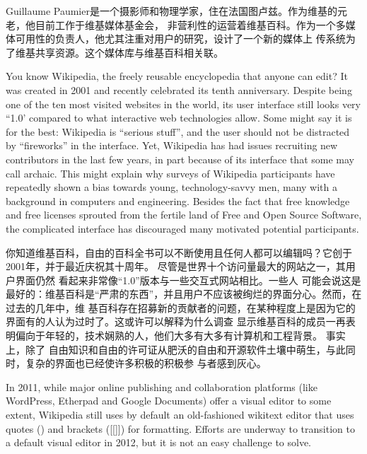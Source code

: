 

Guillaume Paumier是一个摄影师和物理学家，住在法国图卢兹。作为维基的元老，他目前工作于维基媒体基金会，
非营利性的运营着维基百科。作为一个多媒体可用性的负责人，他尤其注重对用户的研究，设计了一个新的媒体上
传系统为了维基共享资源。这个媒体库与维基百科相关联。

\noindent{}You know Wikipedia, the freely reusable encyclopedia that anyone can edit? It
was created in 2001 and recently celebrated its tenth anniversary. Despite being
one of the ten most visited websites in the world, its user interface still
looks very ``1.0' compared to what interactive web technologies allow. Some
might say it is for the best: Wikipedia is ``serious stuff'', and the user
should not be distracted by ``fireworks'' in the interface. Yet, Wikipedia has had
issues recruiting new contributors in the last few years, in part because of its
interface that some may call archaic. This might explain why surveys of
Wikipedia participants have repeatedly shown a bias towards young,
technology-savvy men, many with a background in computers and engineering.
Besides the fact that free knowledge and free licenses sprouted from the fertile
land of Free and Open Source Software, the complicated interface has discouraged
many motivated potential participants.

你知道维基百科，自由的百科全书可以不断使用且任何人都可以编辑吗？它创于2001年，并于最近庆祝其十周年。
尽管是世界十个访问量最大的网站之一，其用户界面仍然 看起来非常像“1.0”版本与一些交互式网站相比。一些人
可能会说这是最好的：维基百科是“严肃的东西”，并且用户不应该被绚烂的界面分心。然而，在过去的几年中，维
基百科存在招募新的贡献者的问题，在某种程度上是因为它的界面有的人认为过时了。这或许可以解释为什么调查 
显示维基百科的成员一再表明偏向于年轻的，技术娴熟的人，他们大多有大多有计算机和工程背景。 事实上，除了
自由知识和自由的许可证从肥沃的自由和开源软件土壤中萌生，与此同时，复杂的界面也已经使许多积极的积极参
与者感到灰心。

In 2011, while major online publishing and collaboration platforms (like
WordPress, Etherpad and Google Documents) offer a visual editor to some extent,
Wikipedia still uses by default an old-fashioned wikitext editor that uses
quotes (\textquotesingle \textquotesingle \textquotesingle \textquotesingle) and
brackets ([[]]) for formatting. Efforts are underway to transition to a default
visual editor in 2012, but it is not an easy challenge to solve.

